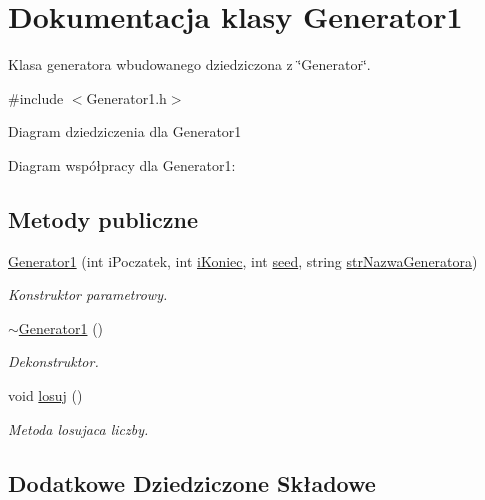 \hypertarget{classGenerator1}{\section{Dokumentacja klasy Generator1}
\label{classGenerator1}
}


Klasa generatora wbudowanego dziedziczona z \char`\"{}\+Generator\char`\"{}.  




{\ttfamily \#include $<$Generator1.\+h$>$}



Diagram dziedziczenia dla Generator1


Diagram współpracy dla Generator1\+:
\subsection*{Metody publiczne}
\begin{DoxyCompactItemize}
\item 
\hyperlink{classGenerator1_a872bdaaf9e8bea3527f0e2c6908a7254}{Generator1} (int i\+Poczatek, int \hyperlink{classGenerator_a235b3d02ce62d19e803cc2295eb7911e}{i\+Koniec}, int \hyperlink{classGenerator_ae77446ccb4946b8eb28d0f20f3e4a95f}{seed}, string \hyperlink{classGenerator_a7e2c131c26baf31bb3f072115c619d1c}{str\+Nazwa\+Generatora})
\begin{DoxyCompactList}\small\item\em Konstruktor parametrowy. \end{DoxyCompactList}\item 
\hypertarget{classGenerator1_ad087f9ed8e1630e064f6a0a06e59415c}{\hyperlink{classGenerator1_ad087f9ed8e1630e064f6a0a06e59415c}{$\sim$\+Generator1} ()}\label{classGenerator1_ad087f9ed8e1630e064f6a0a06e59415c}

\begin{DoxyCompactList}\small\item\em Dekonstruktor. \end{DoxyCompactList}\item 
void \hyperlink{classGenerator1_a4b00ed3593e4be47a2101e0a027dfea6}{losuj} ()
\begin{DoxyCompactList}\small\item\em Metoda losujaca liczby. \end{DoxyCompactList}\end{DoxyCompactItemize}
\subsection*{Dodatkowe Dziedziczone Składowe}


